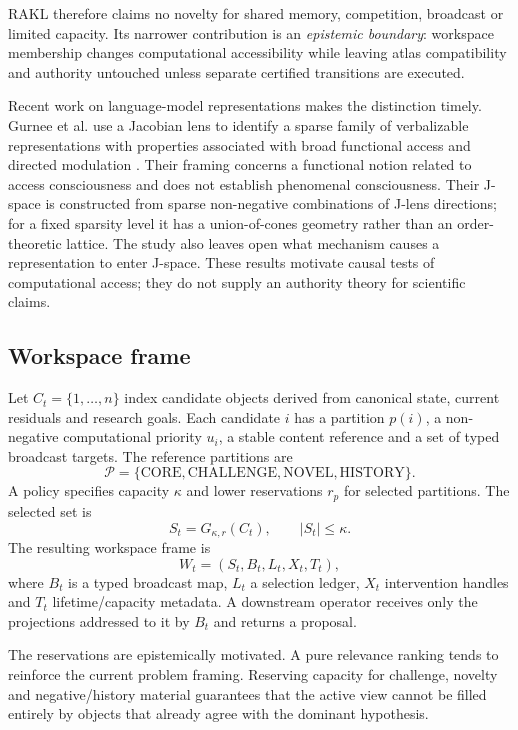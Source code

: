 \documentclass[11pt]{article}
\begin{document}
RAKL therefore claims no novelty for shared memory, competition, broadcast or limited capacity. Its narrower contribution is an \emph{epistemic boundary}: workspace membership changes computational accessibility while leaving atlas compatibility and authority untouched unless separate certified transitions are executed.

Recent work on language-model representations makes the distinction timely. Gurnee et al. use a Jacobian lens to identify a sparse family of verbalizable representations with properties associated with broad functional access and directed modulation \cite{gurnee2026}. Their framing concerns a functional notion related to access consciousness and does not establish phenomenal consciousness. Their J-space is constructed from sparse non-negative combinations of J-lens directions; for a fixed sparsity level it has a union-of-cones geometry rather than an order-theoretic lattice. The study also leaves open what mechanism causes a representation to enter J-space. These results motivate causal tests of computational access; they do not supply an authority theory for scientific claims.

\subsection{Workspace frame}

Let \(C_t=\{1,\ldots,n\}\) index candidate objects derived from canonical state, current residuals and research goals. Each candidate \(i\) has a partition \(p(i)\), a non-negative computational priority \(u_i\), a stable content reference and a set of typed broadcast targets. The reference partitions are
\[
\mathcal P=\{\mathrm{CORE},\mathrm{CHALLENGE},\mathrm{NOVEL},\mathrm{HISTORY}\}.
\]
A policy specifies capacity \(\kappa\) and lower reservations \(r_p\) for selected partitions. The selected set is
\[
S_t=G_{\kappa,r}(C_t),\qquad |S_t|\le \kappa.
\]
The resulting workspace frame is
\[
W_t=(S_t,B_t,L_t,X_t,T_t),
\]
where \(B_t\) is a typed broadcast map, \(L_t\) a selection ledger, \(X_t\) intervention handles and \(T_t\) lifetime/capacity metadata. A downstream operator receives only the projections addressed to it by \(B_t\) and returns a proposal.

The reservations are epistemically motivated. A pure relevance ranking tends to reinforce the current problem framing. Reserving capacity for challenge, novelty and negative/history material guarantees that the active view cannot be filled entirely by objects that already agree with the dominant hypothesis.
\end{document}
